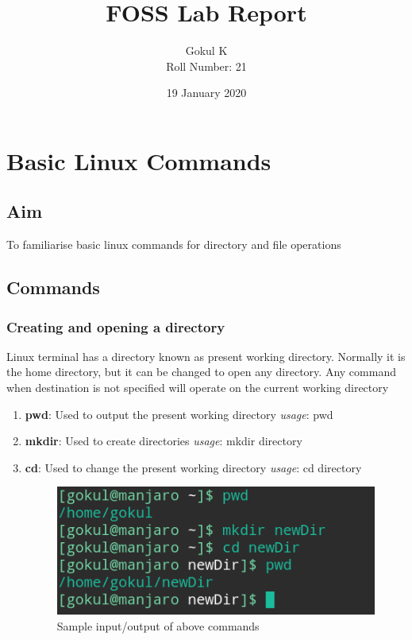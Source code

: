 \documentclass{article}
\begin{document}
\title{FOSS Lab Report}
\author{Gokul K\\[2\baselineskip]
Roll Number: 21\\[2\baselineskip]}
\date{19 January 2020}

\maketitle

\section{Basic Linux Commands}
\subsection{Aim}
To familiarise basic linux commands for directory and file operations
\subsection{Commands}
\subsubsection{Creating and opening a directory}
Linux terminal has a directory known as present working directory. Normally it is the home directory, but it can be changed to open any directory. Any command when destination is not specified will operate on the current working directory

\begin{enumerate}
    \item {\bf pwd}: Used to output the present working directory\newline
    \hspace{\parindent} {\em usage}: pwd
    
    \item {\bf mkdir}: Used to create directories\newline
    \hspace{\parindent} {\em usage}: mkdir directory
    
    \item {\bf cd}: Used to change the present working directory\newline
    \hspace{\parindent} {\em usage}: cd directory
    
    \begin{figure}
        \centering
        \includegraphics[width=.80\textwidth]{img/p1/ss1.png}
        \caption{Sample input/output of above commands}
    \end{figure}
\end{enumerate}
\end{document}
